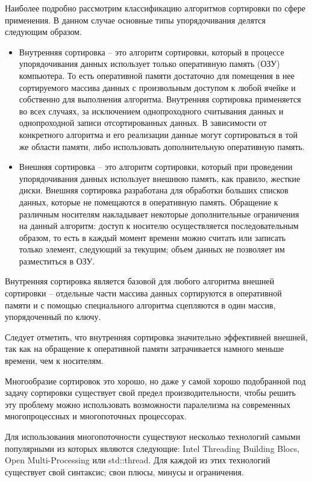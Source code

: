 \documentclass{article}
\begin{document}
Наиболее подробно рассмотрим классификацию алгоритмов сортировки по сфере применения. В данном случае основные типы упорядочивания делятся следующим образом.
\begin{itemize}
\item Внутренняя сортировка – это алгоритм сортировки, который в процессе упорядочивания данных использует только оперативную память (ОЗУ) компьютера. То есть оперативной памяти достаточно для помещения в нее сортируемого массива данных с произвольным доступом к любой ячейке и собственно для выполнения алгоритма. Внутренняя сортировка применяется во всех случаях, за исключением однопроходного считывания данных и однопроходной записи отсортированных данных. В зависимости от конкретного алгоритма и его реализации данные могут сортироваться в той же области памяти, либо использовать дополнительную оперативную память.
\item Внешняя сортировка – это алгоритм сортировки, который при проведении упорядочивания данных использует внешнюю память, как правило, жесткие диски. Внешняя сортировка разработана для обработки больших списков данных, которые не помещаются в оперативную память. Обращение к различным носителям накладывает некоторые дополнительные ограничения на данный алгоритм: доступ к носителю осуществляется последовательным образом, то есть в каждый момент времени можно считать или записать только элемент, следующий за текущим; объем данных не позволяет им разместиться в ОЗУ.
\end{itemize}
Внутренняя сортировка является базовой для любого алгоритма внешней сортировки – отдельные части массива данных сортируются в оперативной памяти и с помощью специального алгоритма сцепляются в один массив, упорядоченный по ключу.

Следует отметить, что внутренняя сортировка значительно эффективней внешней, так как на обращение к оперативной памяти затрачивается намного меньше времени, чем к носителям.

\par Многообразие сортировок это хорошо, но даже у самой хорошо подобранной под задачу сортировки существует свой предел производительности, чтобы решить эту проблему можно использовать возможности паралелизма на современных многопроцессных и многопоточных процессорах.

\par Для использования многопоточности существуют несколько технологий самыми популярными из которых являются следующие: Intel Threading Building Blocs, Open Multi-Processing или std::thread.
Для каждой из этих технологий существует свой синтаксис; свои плюсы, минусы и ограничения.
\end{document}
